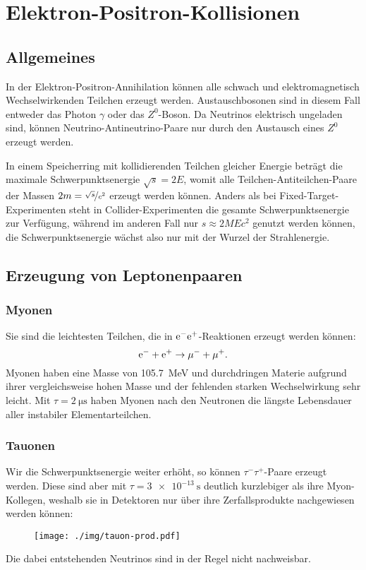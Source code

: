 \chapter{Elektron-Positron-Kollisionen}
\section{Allgemeines}
In der Elektron-Positron-Annihilation können alle schwach und elektromagnetisch Wechselwirkenden Teilchen erzeugt werden.
Austauschbosonen sind in diesem Fall entweder das Photon $\gamma$ oder das $Z^0$-Boson.
Da Neutrinos elektrisch ungeladen sind, können Neutrino-Antineutrino-Paare nur durch den Austausch eines $Z^0$ erzeugt werden.

In einem Speicherring mit kollidierenden Teilchen gleicher Energie beträgt die maximale Schwerpunktsenergie $\sqrt{s}=2E$, womit alle Teilchen-Antiteilchen-Paare der Massen $2m = \nicefrac{\sqrt{s}}{c^2}$ erzeugt werden können.
Anders als bei Fixed-Target-Experimenten steht in Collider-Experimenten die gesamte Schwerpunktsenergie zur Verfügung, während im anderen Fall nur $s\approx 2MEc^2$ genutzt werden können, die Schwerpunktsenergie wächst also nur mit der Wurzel der Strahlenergie.

\section{Erzeugung von Leptonenpaaren}
\subsection{Myonen}
Sie sind die leichtesten Teilchen, die in $\text{e}^-\text{e}^+$-Reaktionen erzeugt werden können:
\begin{equation*}
	\text{e}^- + \text{e}^+ \rightarrow \mu^- + \mu^+.
\end{equation*}
Myonen haben eine Masse von \SI{105.7}{\MeV} und durchdringen Materie aufgrund ihrer vergleichsweise hohen Masse und der fehlenden starken Wechselwirkung sehr leicht.
Mit $\tau=\SI{2}{\micro\second}$ haben Myonen nach den Neutronen die längste Lebensdauer aller instabiler Elementarteilchen.

\subsection{Tauonen}
Wir die Schwerpunktsenergie weiter erhöht, so können $\tau^-\tau^+$-Paare erzeugt werden.
Diese sind aber mit $\tau=\SI{3e-13}{\second}$ deutlich kurzlebiger als ihre Myon-Kollegen, weshalb sie in Detektoren nur über ihre Zerfallsprodukte nachgewiesen werden können:
\begin{figure}[h!]
	\centering
	\texttt{[image: ./img/tauon-prod.pdf]}
\end{figure}
Die dabei entstehenden Neutrinos sind in der Regel nicht nachweisbar.
